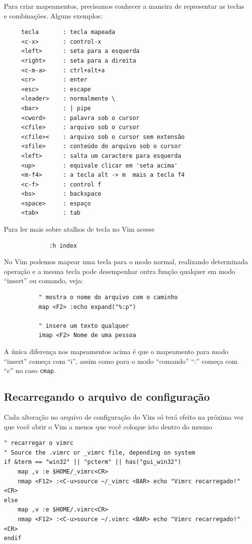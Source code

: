 \documentclass[10pt,a4paper,openany]{book}
\begin{document}
Para criar mapeamentos, precisamos conhecer a maneira de representar
as teclas e combinações. Alguns exemplos:

\begin{verbatim}
	 tecla       : tecla mapeada
	 <c-x>       : control-x
	 <left>	     : seta para a esquerda
	 <right>     : seta para a direita
	 <c-m-a>     : ctrl+alt+a
	 <cr>        : enter
	 <esc>       : escape
	 <leader>    : normalmente \
	 <bar>       : | pipe
	 <cword>     : palavra sob o cursor
	 <cfile>     : arquivo sob o cursor
	 <cfile><    : arquivo sob o cursor sem extensão
	 <sfile>     : conteúdo do arquivo sob o cursor
	 <left>      : salta um caractere para esquerda
	 <up>        : equivale clicar em 'seta acima'
	 <m-f4>      : a tecla alt -> m  mais a tecla f4
	 <c-f>       : control f
	 <bs>        : backspace
	 <space>     : espaço
	 <tab>       : tab
\end{verbatim}

Para ler mais sobre atalhos de tecla no Vim acesse 

\begin{verbatim}
             :h index
\end{verbatim}

No Vim podemos mapear uma tecla para o modo normal, realizando
determinada operação e a mesma tecla pode desempenhar outra função
qualquer em modo ``insert'' ou comando, veja:

\begin{verbatim}
		  " mostra o nome do arquivo com o caminho
		  map <F2> :echo expand("%:p")

		  " insere um texto qualquer
		  imap <F2> Nome de uma pessoa
\end{verbatim}

A única diferença nos mapeamentos acima é que o mapeamento para modo
``insert'' começa com ``i'', assim como para o modo ``comando'' ``:'' começa
com ``c'' no caso \verb|cmap|.

\subsection{Recarregando o arquivo de configuração}
\label{sec:Recarregando o arquivo de configuração}

Cada alteração no arquivo de configuração do Vim só terá efeito na próxima vez que você
abrir o Vim a menos que você coloque isto dentro do mesmo

\begin{verbatim}
" recarregar o vimrc
" Source the .vimrc or _vimrc file, depending on system
if &term == "win32" || "pcterm" || has("gui_win32")
	map ,v :e $HOME/_vimrc<CR>
	nmap <F12> :<C-u>source ~/_vimrc <BAR> echo "Vimrc recarregado!"<CR>
else
	map ,v :e $HOME/.vimrc<CR>
	nmap <F12> :<C-u>source ~/.vimrc <BAR> echo "Vimrc recarregado!"<CR>
endif
\end{verbatim}
\end{document}
